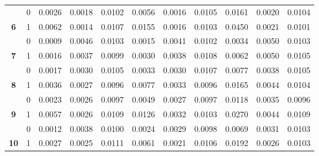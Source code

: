 \begin{table}
\begin{tabular}[t]{>{}ccrrrrrrrrr}
 & 0 & 0.0026 & 0.0018 & 0.0102 & 0.0056 & 0.0016 & 0.0105 & 0.0161 & 0.0020 & 0.0104\\

\multirow[t]{-2}{*}{\centering\arraybackslash \textbf{6}} & 1 & 0.0062 & 0.0014 & 0.0107 & 0.0155 & 0.0016 & 0.0103 & 0.0450 & 0.0021 & 0.0101\\

\rule{0pt}{4ex}
 & 0 & 0.0009 & 0.0046 & 0.0103 & 0.0015 & 0.0041 & 0.0102 & 0.0034 & 0.0050 & 0.0103\\

\multirow[t]{-2}{*}{\centering\arraybackslash \textbf{7}} & 1 & 0.0016 & 0.0037 & 0.0099 & 0.0030 & 0.0038 & 0.0108 & 0.0062 & 0.0050 & 0.0105\\

 & 0 & 0.0017 & 0.0030 & 0.0105 & 0.0033 & 0.0030 & 0.0107 & 0.0077 & 0.0038 & 0.0105\\

\multirow[t]{-2}{*}{\centering\arraybackslash \textbf{8}} & 1 & 0.0036 & 0.0027 & 0.0096 & 0.0077 & 0.0033 & 0.0096 & 0.0165 & 0.0044 & 0.0104\\

 & 0 & 0.0023 & 0.0026 & 0.0097 & 0.0049 & 0.0027 & 0.0097 & 0.0118 & 0.0035 & 0.0096\\

\multirow[t]{-2}{*}{\centering\arraybackslash \textbf{9}} & 1 & 0.0057 & 0.0026 & 0.0109 & 0.0126 & 0.0032 & 0.0103 & 0.0270 & 0.0044 & 0.0109\\

\rule{0pt}{4ex}
 & 0 & 0.0012 & 0.0038 & 0.0100 & 0.0024 & 0.0029 & 0.0098 & 0.0069 & 0.0031 & 0.0103\\

\multirow[t]{-2}{*}{\centering\arraybackslash \textbf{10}} & 1 & 0.0027 & 0.0025 & 0.0111 & 0.0061 & 0.0021 & 0.0106 & 0.0192 & 0.0026 & 0.0103\\
\bottomrule
\end{tabular}
\end{table}
